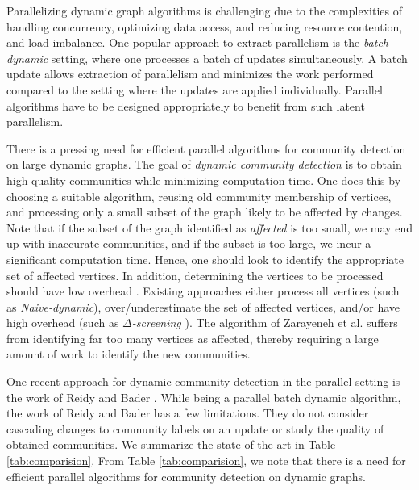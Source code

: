  Parallelizing dynamic graph algorithms is challenging due to the complexities of handling concurrency, optimizing data access, and reducing resource contention, and load imbalance. One popular approach to extract parallelism is the \textit{batch dynamic} setting, where one processes a batch of updates simultaneously. A batch update allows extraction of parallelism and minimizes the work performed compared to the setting where the updates are applied individually. Parallel algorithms have to be designed appropriately to benefit from such latent parallelism.

There is a pressing need for efficient parallel algorithms for community detection on large dynamic graphs. The goal of \textit{dynamic community detection} is to obtain high-quality communities while minimizing computation time. One does this by choosing a suitable algorithm, reusing old community membership of vertices, and processing only a small subset of the graph likely to be affected by changes. Note that if the subset of the graph identified as \textit{affected} is too small, we may end up with inaccurate communities, and if the subset is too large, we incur a significant computation time. Hence, one should look to identify the appropriate set of affected vertices. In addition, determining the vertices to be processed should have low overhead \cite{incr-ramalingam96}. Existing approaches either process all vertices (such as \textit{Naive-dynamic}), over/underestimate the set of affected vertices, and/or have high overhead (such as \textit{$\Delta$-screening} \cite{com-zarayeneh21}). The algorithm of Zarayeneh et al. \cite{com-zarayeneh21} suffers from identifying far too many vertices as affected, thereby requiring a large amount of work to identify the new communities.

One recent approach for dynamic community detection in the parallel setting is the work of Reidy and Bader \cite{com-riedy13}. While being a parallel batch dynamic algorithm, the work of Reidy and Bader \cite{com-riedy13} has a few limitations. They do not consider cascading changes to community labels on an update or study the quality of obtained communities. We summarize the state-of-the-art in Table \ref{tab:comparision}. From Table \ref{tab:comparision}, we note that there is a need for efficient parallel algorithms for community detection on dynamic graphs.

